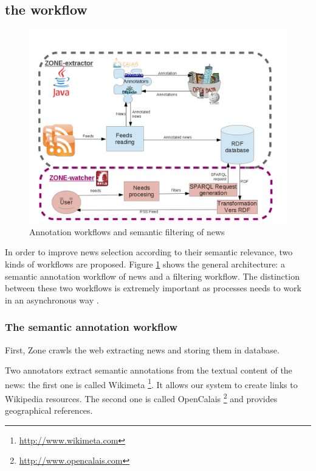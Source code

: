 \documentclass{llncs}
\begin{document}
\subsection{the workflow}
%
\begin{figure}[htb!]
	\begin{centering}
	\includegraphics[width=1\textwidth]{diagramArchi.png}
	\caption{Annotation workflows and semantic filtering of news}
	\label{fig:WF}
	\end{centering}
\end{figure}

In order to improve news selection according to their semantic relevance, two kinds of workflows are proposed. Figure \ref{fig:WF} shows the general architecture: a semantic annotation workflow of news and a filtering workflow. The distinction between these two workflows is extremely important as processes needs to work in an asynchronous way \cite{desclaux:urli}.

\subsubsection{The semantic annotation workflow}
First, Zone crawls the web extracting news and storing them in database.

Two annotators extract semantic annotations from the textual content of the news: the first one is called Wikimeta \footnote{\url{http://www.wikimeta.com}}. It allows our system to create links to Wikipedia resources. The second one is called OpenCalais \footnote{\url{http://www.opencalais.com}} and provides geographical references.
\end{document}
